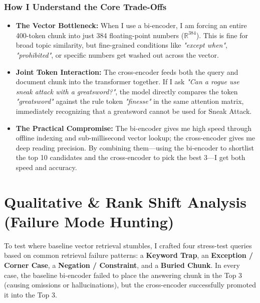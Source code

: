 \documentclass[10pt,a4paper]{article}
\begin{document}
\vspace{-3pt}
\subsubsection*{How I Understand the Core Trade-Offs}
\begin{itemize}[leftmargin=1.4em, itemsep=2pt, topsep=1pt]
  \item \textbf{The Vector Bottleneck:} When I use a bi-encoder, I am forcing an entire 400-token chunk into just 384 floating-point numbers ($\mathbb{R}^{384}$). This is fine for broad topic similarity, but fine-grained conditions like \textit{"except when"}, \textit{"prohibited"}, or specific numbers get washed out across the vector.
  \item \textbf{Joint Token Interaction:} The cross-encoder feeds both the query and document chunk into the transformer together. If I ask \textit{"Can a rogue use sneak attack with a greatsword?"}, the model directly compares the token \textit{"greatsword"} against the rule token \textit{"finesse"} in the same attention matrix, immediately recognizing that a greatsword cannot be used for Sneak Attack.
  \item \textbf{The Practical Compromise:} The bi-encoder gives me high speed through offline indexing and sub-millisecond vector lookup; the cross-encoder gives me deep reading precision. By combining them---using the bi-encoder to shortlist the top 10 candidates and the cross-encoder to pick the best 3---I get both speed and accuracy.
\end{itemize}

\newpage


\section{Qualitative \& Rank Shift Analysis (Failure Mode Hunting)}

To test where baseline vector retrieval stumbles, I crafted four stress-test queries based on common retrieval failure patterns: a \textbf{Keyword Trap}, an \textbf{Exception / Corner Case}, a \textbf{Negation / Constraint}, and a \textbf{Buried Chunk}. In every case, the baseline bi-encoder failed to place the answering chunk in the Top 3 (causing omissions or hallucinations), but the cross-encoder successfully promoted it into the Top 3.
\end{document}
